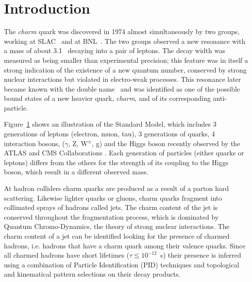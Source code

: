 \documentclass[12pt, a4paper, twoside, titlepage]{article}
\begin{document}

\section{Introduction}
The \emph{charm} quark was discovered in 1974 almost simultaneously by two groups, working at SLAC~\cite{Richter:1974} and at BNL~\cite{Ting:1974}.
The two groups observed a new resonance with a mass of about 3.1 \GeVcsq\ decaying into a pair of leptons.
The decay width was measured as being smaller than experimental precision; this feature
was in itself a strong indication of the existence of a new quantum number, conserved by strong nuclear interactions 
but violated in electro-weak processes.
This resonance later became known with the double name \jpsi\ and was identified as one of the possible bound states
of a new heavier quark, \emph{charm}, and of its corresponding anti-particle. 
\begin{comment}
A few years later (1977) an even heavier quark, the \emph{bottom} quark,
was discovered~\cite{Lederman:1977}; the sixth and last known quark, \emph{top}, took a bit longer (1995), due to its comparatively huge mass of about 173 \GeVcsq~\cite{CDF:1995,D0:1995}.
\end{comment}

Figure~\ref{} shows an illustration of the Standard Model, which includes
3 generations of leptons (electron, muon, tau), 3 generations of quarks, 4 interaction bosons, ($\gamma$, Z, $\mathrm{W}^{\pm}$, g) and the Higgs boson
recently observed by the ATLAS and CMS Collaborations \cite{ATLAS:2012b,CMS:2012d}.
Each generation of particles (either quarks or leptons) differs from the others for the strength of its coupling to the Higgs boson,
which result in a different observed mass.

At hadron colliders charm quarks are produced as a result of a parton hard scattering. Likewise lighter quarks or gluons, charm quarks
fragment into collimated sprays of hadrons called jets. The charm content of the jet is conserved throughout the fragmentation process,
which is dominated by Quantum Chromo-Dynamics, the theory of strong nuclear interactions.
The charm content of a jet can be identified looking for the presence of charmed hadrons, i.e. hadrons that have
a charm quark among their valence quarks. Since all charmed hadrons have short lifetimes ($\tau \lesssim 10^{-12}$~s) their presence is inferred
using a combination of Particle Identification (PID) techniques and topological and kinematical pattern selections on their decay products.
\end{document}
